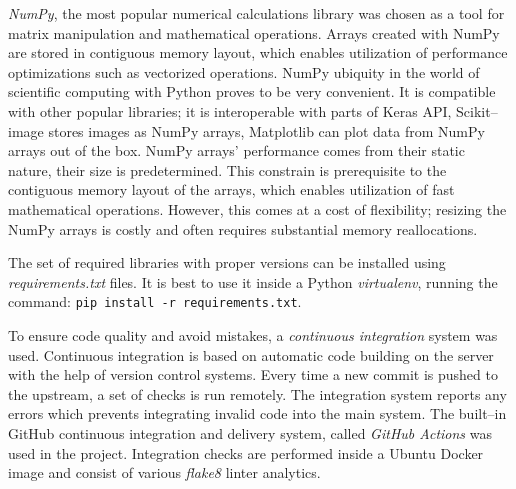 \textit{NumPy}, the most popular numerical calculations library was chosen as a tool for matrix manipulation and mathematical operations.
Arrays created with NumPy are stored in contiguous memory layout, which enables utilization of performance optimizations such as vectorized operations. 
NumPy ubiquity in the world of scientific computing with Python proves to be very convenient.
It is compatible with other popular libraries; it is interoperable with parts of Keras API, Scikit--image stores images as NumPy arrays, Matplotlib can plot data from NumPy arrays out of the box.
NumPy arrays' performance comes from their static nature, their size is predetermined.
This constrain is prerequisite to the contiguous memory layout of the arrays, which enables utilization of fast mathematical operations.
However, this comes at a cost of flexibility; resizing the NumPy arrays is costly and often requires substantial memory reallocations.

The set of required libraries with proper versions can be installed using \textit{requirements.txt} files.
It is best to use it inside a Python \textit{virtualenv}, running the command: \texttt{pip install -r requirements.txt}.

To ensure code quality and avoid mistakes, a \textit{continuous integration} system was used.
Continuous integration is based on automatic code building on the server with the help of version control systems.
Every time a new commit is pushed to the upstream, a set of checks is run remotely.
The integration system reports any errors which prevents integrating invalid code into the main system.
The built--in GitHub continuous integration and delivery system, called \textit{GitHub Actions} was used in the project.
Integration checks are performed inside a Ubuntu Docker image and consist of various \textit{flake8} linter analytics.

